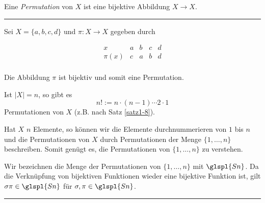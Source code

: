 \documentclass[9pt]{article}
\begin{document}
\begin{defi} Eine \textit{Permutation} von \( X \) ist eine bijektive Abbildung \( X \to X \).
\end{defi} \noindent \rule{8cm}{0.4pt}
\begin{bsp}Sei \( X = \{a, b, c, d\} \) und \( \pi : X \to X \) gegeben durch

\[
\begin{array}{c|cccc}
x & a & b & c & d \\
\hline
\pi(x) & c & a & b & d \\
\end{array}
\]

Die Abbildung \( \pi \) ist bijektiv und somit eine Permutation.
 
Ist \( |X| = n \), so gibt es
\[
n! := n \cdot (n - 1) \cdots 2 \cdot 1
\]
Permutationen von \( X \) (z.B. nach Satz \ref{satz1-8}).

Hat \( X \) \( n \) Elemente, so können wir die Elemente durchnummerieren von \( 1 \) bis \( n \) und die Permutationen von \( X \) durch Permutationen der Menge \( \{1, \dots, n\} \) beschreiben. Somit genügt es, die Permutationen von \( \{1, \dots, n\} \) zu verstehen.

Wir bezeichnen die Menge der Permutationen von \( \{1, \dots, n\} \) mit \( \glspl{Sn} \). Da die Verknüpfung von bijektiven Funktionen wieder eine bijektive Funktion ist, gilt \( \sigma \pi \in \glspl{Sn} \) für \( \sigma, \pi \in \glspl{Sn} \). \\
\end{bsp} \noindent \rule{8cm}{0.4pt}
\end{document}
